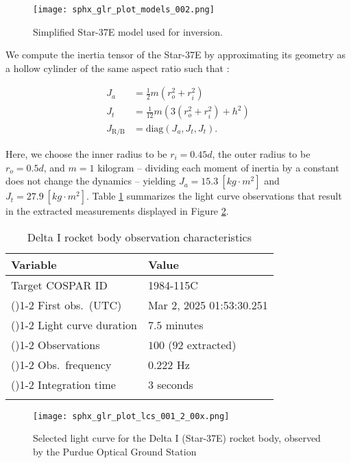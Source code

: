 \documentclass[a4paper,twocolumn]{spaceDebrisC} %
\newcommand{\grule}[0]{\arrayrulecolor{darkgray}\cmidrule(){1-2}}
\newcommand{\brule}[0]{\arrayrulecolor{black} \bottomrule}
\newcommand{\figbig}[0]{0.5\textwidth}
\begin{document}
\begin{figure}[H]
  \centering
  \texttt{[image: sphx\_glr\_plot\_models\_002.png]}
  \caption{Simplified Star-37E model used for inversion.}
  \label{fig:star37e_simple}
\end{figure}

We compute the inertia tensor of the Star-37E by approximating its geometry as a hollow cylinder of the same aspect ratio such that \cite{serway2019}:

\begin{align}
 J_a &= \frac{1}{2} m \left(r_o^2+r_i^2\right) \\
 J_t &= \frac{1}{12} m \left(3 \left(r_o^2+r_i^2\right) + h^2\right) \\
 J_\text{R/B} &= \text{diag} \left(J_a, J_t, J_t\right).
\end{align}

Here, we choose the inner radius to be $r_i=0.45d$, the outer radius to be $r_o=0.5d$, and $m=1$ kilogram -- dividing each moment of inertia by a constant does not change the dynamics -- yielding $J_a = 15.3 \: [kg \cdot m^2]$ and $J_t = 27.9 \: [kg \cdot m^2]$. Table \ref{tb:case2_in} summarizes the light curve observations that result in the extracted measurements displayed in Figure \ref{fig:rb_lc_obs}.

\begin{table}[H]
  \centering
  \renewcommand{\arraystretch}{1.3} %
  \caption{Delta I rocket body observation characteristics}
  \vspace*{6pt}
  \begin{tabular}{@{} l l @{}}
    \toprule
    Variable & Value \\ \midrule
    Target COSPAR ID & 1984-115C \\ \grule
    First obs.\ (UTC) & Mar 2, 2025 01:53:30.251 \\ \grule
    Light curve duration & $7.5$ minutes \\ \grule
    Observations & $100$ ($92$ extracted) \\ \grule
    Obs.\ frequency & $0.222$ Hz \\ \grule
    Integration time & $3$ seconds \\ \brule
  \end{tabular}
  \label{tb:case2_in}
\end{table}

\begin{figure}[H]
  \centering
  \texttt{[image: sphx\_glr\_plot\_lcs\_001\_2\_00x.png]}
  \caption{Selected light curve for the Delta I (Star-37E) rocket body, observed by the Purdue Optical Ground Station}
  \label{fig:rb_lc_obs}
\end{figure}
\end{document}
